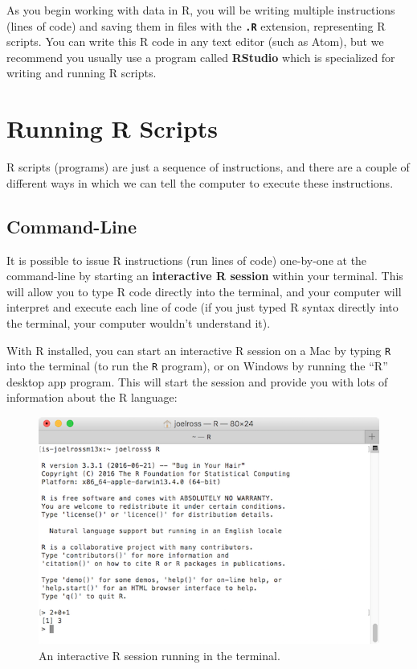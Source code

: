 \documentclass[]{book}
\theoremstyle{definition}
\theoremstyle{definition}
\theoremstyle{remark}
\begin{document}
As you begin working with data in R, you will be writing multiple
instructions (lines of code) and saving them in files with the
\textbf{\texttt{.R}} extension, representing R scripts. You can write
this R code in any text editor (such as Atom), but we recommend you
usually use a program called \textbf{RStudio} which is specialized for
writing and running R scripts.

\section{Running R Scripts}\label{running-r-scripts}

R scripts (programs) are just a sequence of instructions, and there are
a couple of different ways in which we can tell the computer to execute
these instructions.

\subsection{Command-Line}\label{rscript-cmd}

It is possible to issue R instructions (run lines of code) one-by-one at
the command-line by starting an \textbf{interactive R session} within
your terminal. This will allow you to type R code directly into the
terminal, and your computer will interpret and execute each line of code
(if you just typed R syntax directly into the terminal, your computer
wouldn't understand it).

With R installed, you can start an interactive R session on a Mac by
typing \texttt{R} into the terminal (to run the \texttt{R} program), or
on Windows by running the ``R'' desktop app program. This will start the
session and provide you with lots of information about the R language:

\begin{figure}
\centering
\includegraphics{img/r-intro/r-interactive-session.png}
\caption{An interactive R session running in the terminal.}
\end{figure}
\end{document}
